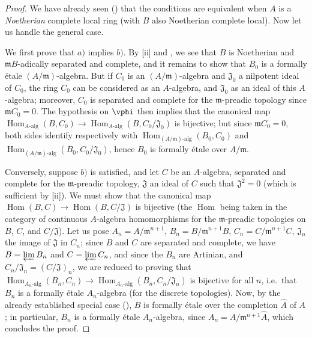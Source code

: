 \begin{proof}
We have already seen () that the conditions are equivalent when $A$ is a \emph{Noetherian} complete local ring (with $B$ also Noetherian complete local).
Now let us handle the general case.

We first prove that $a)$ implies $b)$.
By [ii] and , we see that $B$ is Noetherian and $\mathfrak{m}B$-adically separated and complete, and it remains to show that $B_0$ is a formally \'etale $(A/\mathfrak{m})$-algebra.
But if $C_0$ is an $(A/\mathfrak{m})$-algebra and $\mathfrak{J}_0$ a nilpotent ideal of $C_0$, the ring $C_0$ can be considered as an $A$-algebra, and $\mathfrak{J}_0$ as an ideal of this $A$-algebra;
moreover, $C_0$ is separated and complete for the $\mathfrak{m}$-preadic topology since $\mathfrak{m}C_0=0$.
The hypothesis on $\vphi$ then implies that the canonical map $\operatorname{Hom}_{A\text{-}\mathrm{alg}}(B,C_0)\to\operatorname{Hom}_{A\text{-}\mathrm{alg}}(B,C_0/\mathfrak{J}_0)$ is bijective;
but since $\mathfrak{m}C_0=0$, both sides identify respectively with $\operatorname{Hom}_{(A/\mathfrak{m})\text{-}\mathrm{alg}}(B_0,C_0)$ and $\operatorname{Hom}_{(A/\mathfrak{m})\text{-}\mathrm{alg}}(B_0,C_0/\mathfrak{J}_0)$, hence $B_0$ is formally \'etale over $A/\mathfrak{m}$.

Conversely, suppose $b)$ is satisfied, and let $C$ be an $A$-algebra, separated and complete for the $\mathfrak{m}$-preadic topology, $\mathfrak{J}$ an ideal of $C$ such that $\mathfrak{J}^2=0$ (which is sufficient by [ii]).
We must show that the canonical map $\operatorname{Hom}(B,C)\to\operatorname{Hom}(B,C/\mathfrak{J})$ is bijective (the $\operatorname{Hom}$ being taken in the category of continuous $A$-algebra homomorphisms for the $\mathfrak{m}$-preadic topologies on $B$, $C$, and $C/\mathfrak{J}$).
Let us pose $A_n=A/\mathfrak{m}^{n+1}$, $B_n=B/\mathfrak{m}^{n+1}B$, $C_n=C/\mathfrak{m}^{n+1}C$, $\mathfrak{J}_n$ the image of $\mathfrak{J}$ in $C_n$;
since $B$ and $C$ are separated and complete, we have $B=\varprojlim B_n$ and $C=\varprojlim C_n$, and since the $B_n$ are Artinian, and $C_n/\mathfrak{J}_n=(C/\mathfrak{J})_n$, we are reduced to proving that $\operatorname{Hom}_{A_n\text{-}\mathrm{alg}}(B_n,C_n)\to\operatorname{Hom}_{A_n\text{-}\mathrm{alg}}(B_n,C_n/\mathfrak{J}_n)$ is bijective for all $n$, i.e.\ that $B_n$ is a formally \'etale $A_n$-algebra (for the discrete topologies).
Now, by the already established special case (), $B$ is formally \'etale over the completion $\hat{A}$ of $A$;
in particular, $B_n$ is a formally \'etale $A_n$-algebra, since $A_n=\hat{A}/\mathfrak{m}^{n+1}\hat{A}$, which concludes the proof.
\end{proof}

